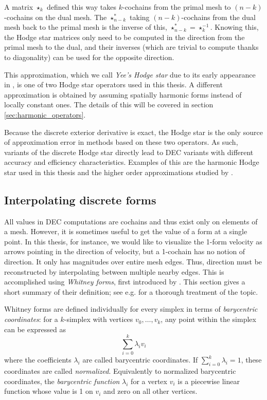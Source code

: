 \documentclass[utf8,english]{gradu3}
\begin{document}
A matrix $\star_k$ defined this way takes $k$-cochains from the primal mesh
to $(n-k)$-cochains on the dual mesh.
The $\star^*_{n-k}$ taking $(n-k)$-cochains from the dual mesh back to the primal mesh
is the inverse of this, $\star^*_{n-k} = \star_k^{-1}$.
Knowing this, the Hodge star matrices only need to be computed
in the direction from the primal mesh to the dual, and their inverses
(which are trivial to compute thanks to diagonality)
can be used for the opposite direction.

This approximation, which we call \textit{Yee's Hodge star}
due to its early appearance in \textcite{yee_numerical_1966},
is one of two Hodge star operators used in this thesis.
A different approximation is obtained by assuming spatially harmonic forms
instead of locally constant ones.
The details of this will be covered in section \ref{sec:harmonic_operators}.

Because the discrete exterior derivative is exact,
the Hodge star is the only source of approximation error
in methods based on these two operators.
As such, variants of the discrete Hodge star directly lead to
DEC variants with different accuracy and efficiency characteristics.
Examples of this are the harmonic Hodge star used in this thesis
and the higher order approximations studied by \textcite{lohi_higher_2023}.


\subsection{Interpolating discrete forms}\label{sec:interpolation}

All values in DEC computations are cochains
and thus exist only on elements of a mesh.
However, it is sometimes useful to get the value of a form at a single point.
In this thesis, for instance, we would like to visualize
the 1-form velocity as arrows pointing in the direction of velocity,
but a 1-cochain has no notion of direction.
It only has magnitudes over entire mesh edges.
Thus, direction must be reconstructed by interpolating between multiple nearby edges.
This is accomplished using \textit{Whitney forms},
first introduced by \textcite{whitney_geometric_1957}.
This section gives a short summary of their definition;
see e.g. \parencite{lohi_whitney_2021} for a thorough treatment of the topic.

Whitney forms are defined individually for every simplex
in terms of \textit{barycentric coordinates}:
for a $k$-simplex with vertices $v_0, \dots, v_k$,
any point within the simplex can be expressed as
\[
  \sum_{i=0}^k \lambda_i v_i
\]
where the coefficients $\lambda_i$ are called barycentric coordinates.
If $\sum_{i=0}^k \lambda_i = 1$, these coordinates are called \textit{normalized}.
Equivalently to normalized barycentric coordinates,
the \textit{barycentric function} $\lambda_i$ for a vertex $v_i$
is a piecewise linear function whose value is 1 on $v_i$
and zero on all other vertices.
\end{document}
